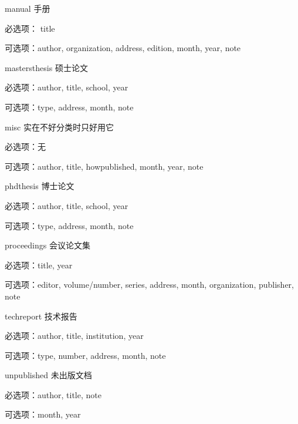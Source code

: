 \begin{compactdesc}
  \item [manual] 手册
    \begin{compactitem}
      \item 必选项： title
      \item 可选项：author, organization, address, edition, month, year, note
    \end{compactitem}
  \item [mastersthesis] 硕士论文
    \begin{compactitem}
      \item 必选项：author, title, school, year
      \item 可选项：type, address, month, note
    \end{compactitem}
  \item [misc] 实在不好分类时只好用它
    \begin{compactitem}
      \item 必选项：无
      \item 可选项：author, title, howpublished, month, year, note
    \end{compactitem}
  \item [phdthesis] 博士论文
    \begin{compactitem}
      \item 必选项：author, title, school, year
      \item 可选项：type, address, month, note
    \end{compactitem}
  \item [proceedings] 会议论文集
    \begin{compactitem}
      \item 必选项：title, year
      \item 可选项：editor, volume/number, series, address, month, organization, publisher, note
    \end{compactitem}
  \item [techreport] 技术报告
    \begin{compactitem}
      \item 必选项：author, title, institution, year
      \item 可选项：type, number, address, month, note
    \end{compactitem}
  \item [unpublished] 未出版文档
    \begin{compactitem}
      \item 必选项：author, title, note
      \item 可选项：month, year
    \end{compactitem}
\end{compactdesc}

